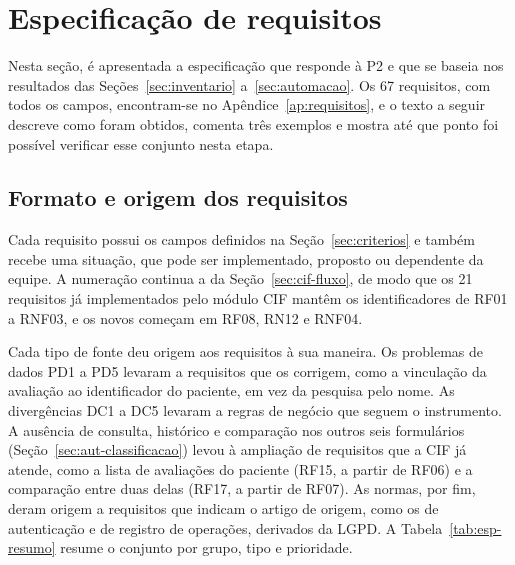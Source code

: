 \section{Especificação de requisitos}
\label{sec:especificacao}

Nesta seção, é apresentada a especificação que responde à P2 e que se baseia nos resultados das
Seções~\ref{sec:inventario} a~\ref{sec:automacao}. Os 67 requisitos, com todos os campos, encontram-se no
Apêndice~\ref{ap:requisitos}, e o texto a seguir descreve como foram obtidos, comenta três exemplos e mostra até que
ponto foi possível verificar esse conjunto nesta etapa.

\subsection{Formato e origem dos requisitos}
\label{sec:esp-formato}

Cada requisito possui os campos definidos na Seção~\ref{sec:criterios} e também recebe uma situação, que pode ser
implementado, proposto ou dependente da equipe. A numeração continua a da Seção~\ref{sec:cif-fluxo}, de modo que os
21 requisitos já implementados pelo módulo CIF mantêm os identificadores de RF01 a RNF03, e os novos começam em RF08,
RN12 e RNF04.

Cada tipo de fonte deu origem aos requisitos à sua maneira. Os problemas de dados PD1 a PD5 levaram a requisitos que
os corrigem, como a vinculação da avaliação ao identificador do paciente, em vez da pesquisa pelo nome. As
divergências DC1 a DC5 levaram a regras de negócio que seguem o instrumento. A ausência de consulta, histórico e
comparação nos outros seis formulários (Seção~\ref{sec:aut-classificacao}) levou à ampliação de requisitos que a CIF
já atende, como a lista de avaliações do paciente (RF15, a partir de RF06) e a comparação entre duas delas (RF17, a
partir de RF07). As normas, por fim, deram origem a requisitos que indicam o artigo de origem, como os de
autenticação e de registro de operações, derivados da LGPD. A Tabela~\ref{tab:esp-resumo} resume o conjunto por
grupo, tipo e prioridade.

